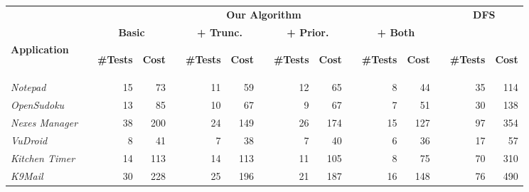 \begin{table}[t!]
\vspace*{-3ex}
\centering
{}
\label{table:algoEffectiveness}
{
\begin{tabular}{@{}lr@{}rrr@{}rrr@{}rrr@{}rrr@{}rr@{}}
\toprule
&&\multicolumn{11}{c}{\bf{Our Algorithm}}
&&\multicolumn{2}{c}{\bf{DFS}}\\
&&\multicolumn{2}{c}{\bf{Basic}}
&&\multicolumn{2}{c}{\bf{+ Trunc.}}
&&\multicolumn{2}{c}{\bf{+ Prior.}}
&&\multicolumn{2}{c}{\bf{+ Both}}
\\
\cmidrule{3-4}
\cmidrule{6-7}
\cmidrule{9-10}
\cmidrule{12-13}
\cmidrule{15-16}
\bf{Application}&&\begin{sideways}\bf{\#Tests}\end{sideways}&\begin{sideways}\bf{Cost}\end{sideways}&&\begin{sideways}\bf{\#Tests}\end{sideways}&\begin{sideways}\bf{Cost}\end{sideways}&&\begin{sideways}\bf{\#Tests}\end{sideways}&\begin{sideways}\bf{Cost}\end{sideways}&&\begin{sideways}\bf{\#Tests}\end{sideways}&\begin{sideways}\bf{Cost}\end{sideways}&&\begin{sideways}\bf{\#Tests}\end{sideways}&\begin{sideways}\bf{Cost}\end{sideways}\\
\midrule
\textit{Notepad}&&15&73&&11&59&&12&65&&8&44&&35&114\\
\textit{OpenSudoku}&&13&85&&10&67&&9&67&&7&51&&30&138\\
\textit{Nexes Manager}&&38&200&&24&149&&26&174&&15&127&&97&354\\
\midrule
\textit{VuDroid}&&8&41&&7&38&&7&40&&6&36&&17&57\\
\textit{Kitchen Timer}&&14&113&&14&113&&11&105&&8&75&&70&310\\
\textit{K9Mail}&&30&228&&25&196&&21&187&&16&148&&76&490\\
\bottomrule
\end{tabular}
}
\end{table}
